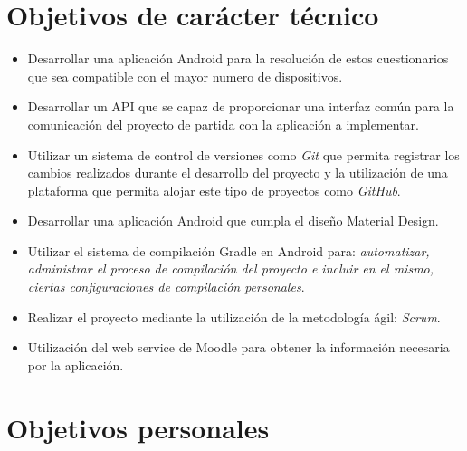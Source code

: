 \section{Objetivos de carácter técnico}

\begin{itemize}
	
	\item Desarrollar una aplicación Android para la resolución de estos cuestionarios que sea compatible con el mayor numero de dispositivos.
	
	\item Desarrollar un API que se capaz de proporcionar una interfaz común para la comunicación del proyecto de partida con la aplicación a implementar.
	
	\item Utilizar un sistema de control de versiones como \emph{Git} que permita registrar los cambios realizados durante el desarrollo del proyecto y la utilización de una plataforma que permita alojar este tipo de proyectos como \emph{GitHub}.
		
	\item Desarrollar una aplicación Android que cumpla el diseño Material Design.
	
	\item Utilizar el sistema de compilación Gradle en Android para: \emph{automatizar, administrar el proceso de compilación del proyecto e incluir en el mismo, ciertas configuraciones de compilación personales}.
	
	\item Realizar el proyecto mediante la utilización de la metodología ágil: \emph{Scrum}.
	
	\item Utilización del web service de Moodle para obtener la información necesaria por la aplicación.

\end{itemize}


\section{Objetivos personales}

